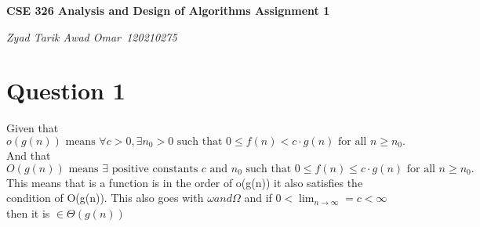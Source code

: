 \documentclass{report}
\begin{document}
	\begin{titlepage}
		\centering
		{\huge\bfseries CSE 326	Analysis and Design of Algorithms Assignment 1 \par}
		\vspace{1cm}
		{\Large\itshape Zyad Tarik Awad Omar~120210275\par}
	\end{titlepage}
	
	
	\section*{Question 1}
	Given that $o(g(n)) \text{ means } \forall c > 0, \exists n_0 > 0 \text{ such that } 0 \leq f(n) < c \cdot g(n) \text{ for all } n \geq n_0.$	
	\newline And that $O(g(n)) \text{ means } \exists \text{ positive constants } c \text{ and } n_0 \text{ such that } 0 \leq f(n) \leq c \cdot g(n) \text{ for all } n \geq n_0.$
	This means that is a function is in the order of o(g(n)) it also satisfies the condition of O(g(n)).
	This also goes with $\omega and \Omega$ and if $0 < \lim_{n \to \infty} = c < \infty $ then it is $\in \Theta(g(n))$
	
\end{document}
